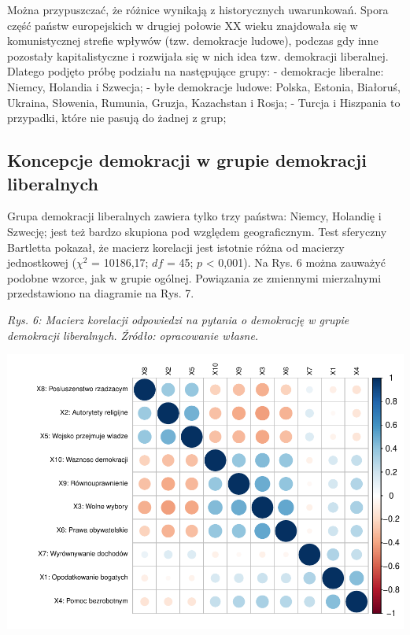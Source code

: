 \documentclass[12pt]{article}
\begin{document}
Można przypuszczać, że różnice wynikają z historycznych uwarunkowań. Spora część państw europejskich w drugiej połowie XX wieku znajdowała się w komunistycznej strefie wpływów (tzw. demokracje ludowe), podczas gdy inne pozostały kapitalistyczne i rozwijała się w nich idea tzw. demokracji liberalnej. Dlatego podjęto próbę podziału na następujące grupy:
- demokracje liberalne: Niemcy, Holandia i Szwecja;
- byłe demokracje ludowe: Polska, Estonia, Białoruś, Ukraina, Słowenia, Rumunia, Gruzja, Kazachstan i Rosja;
- Turcja i Hiszpania to przypadki, które nie pasują do żadnej z grup;

\hypertarget{koncepcje-demokracji-w-grupie-demokracji-liberalnych}{%
\subsection{Koncepcje demokracji w grupie demokracji liberalnych}\label{koncepcje-demokracji-w-grupie-demokracji-liberalnych}}

Grupa demokracji liberalnych zawiera tylko trzy państwa: Niemcy, Holandię i Szwecję; jest też bardzo skupiona pod względem geograficznym. Test sferyczny Bartletta pokazał, że macierz korelacji jest istotnie różna od macierzy jednostkowej (\(\chi^2\) = 10186,17; \(df\) = 45; \(p\) \textless{} 0,001). Na Rys. 6 można zauważyć podobne wzorce, jak w grupie ogólnej. Powiązania ze zmiennymi mierzalnymi przedstawiono na diagramie na Rys. 7.

\emph{Rys. 6: Macierz korelacji odpowiedzi na pytania o demokrację w grupie demokracji liberalnych. Źródło: opracowanie własne.}

\begin{flushleft}\includegraphics{text_ASA_files/figure-latex/cor-matrix-lib-1} \end{flushleft}
\end{document}
